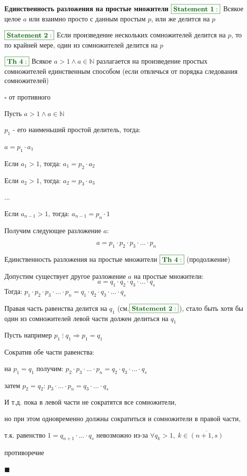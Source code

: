 \documentclass[8pt, aspectratio=169]{beamer}
\newcommand{\Th}[1]{{\color{darkgreen}\boxed{\color{darkgreen}\mathbf{Th~#1:}}}}
\newcommand{\St}[1]{{\color{darkgreen}\boxed{\color{darkgreen}\mathbf{Statement~#1:}}}}
\begin{document}
\begin{frame}{\textbf{Единственность разложения на простые множители}}
$\St{1}$ Всякое целое $a$ или взаимно просто с данным простым $p$, или же делится на $p$

$\St{2}$ Если произведение нескольких сомножителей делится на $p$, то по крайней мере, один из сомножителей делится на $p$

$\Th{4}$ Всякое $a > 1 \land a \in \mathbb{N}$ разлагается на произведение простых сомножителей единственным способом (если отвлечься от порядка следования сомножителей)

$\square$ от противного

Пусть $a>1 \land a\in \mathbb{N}$

$p_1$ - его наименьший простой делитель, тогда:

$a = p_1\cdot a_1$

Если $a_1 > 1$, тогда: $a_1 = p_2\cdot a_2$

Если $a_2 > 1$, тогда: $a_2 = p_3\cdot a_3$

$...$

Если $a_{n-1} > 1$, тогда: $a_{n - 1} = p_n \cdot 1$

Получим следующее разложение $a$:

\[
a = p_1 \cdot p_2 \cdot p_3 \cdot ... \cdot p_n
\]
\end{frame}

\begin{frame}{Единственность разложения на простые множители}
$\Th{4}$ (продолжение)

Допустим существует другое разложение $a$ на простые множители:
\[
a = q_1 \cdot q_2 \cdot q_3 \cdot ... \cdot q_s
\]
Тогда: $p_1 \cdot p_2 \cdot p_3 \cdot ... \cdot p_n = q_1 \cdot q_2 \cdot q_3 \cdot ... \cdot q_s$

Правая часть равенства делится на $q_1$ (см.$\St{2}$), стало быть хотя бы один из сомножителей левой части должен делиться на $q_1$

Пусть например $p_1\mathbin{\vdots}q_1 \Rightarrow p_1 = q_1$

\vspace{0.3cm}

Сократив обе части равенства:

на $p_1 = q_1$ получим: $p_2 \cdot p_3 \cdot ... \cdot p_n = q_2 \cdot q_3 \cdot ... \cdot q_s$

затем $p_2 = q_2$: $p_3 \cdot ... \cdot p_n = q_3 \cdot ... \cdot q_s$

И т.д. пока в левой части не сократятся все сомножители,

но при этом одновременно должны сократиться и сомножители в правой части,

т.к. равенство $1 = q_{n+1}\cdot ... \cdot q_s$ невозможно из-за $\forall{q_k} > 1,\; k \in \overline{(n+1, s)}$

противоречие

$\blacksquare$
\end{frame}
\end{document}
